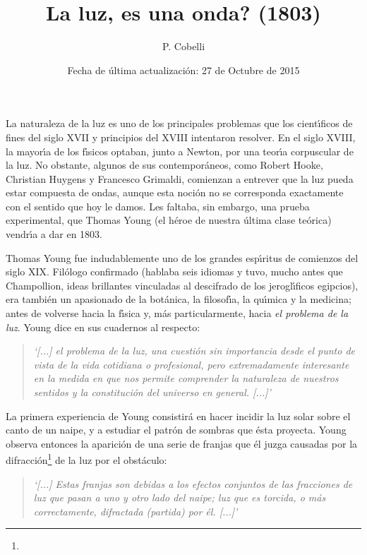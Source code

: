 \documentclass{article}
\begin{document}
\title{La luz, es una onda? (1803)}
\author{P. Cobelli}
\date{Fecha de \'ultima actualizaci\'on: 27 de Octubre de 2015}
\maketitle

La naturaleza de la luz es uno de los principales problemas que los 
cient\'\i ficos de fines del siglo XVII y principios del XVIII intentaron
resolver. En el siglo XVIII, la mayor\'\i a de los f\'\i sicos optaban,
junto a Newton, por una teor\'\i a corpuscular de la luz. No obstante, algunos
de sus contempor\'aneos, como Robert Hooke, Christian Huygens y Francesco
Grimaldi, comienzan a entrever que la luz pueda estar compuesta de ondas, 
aunque esta noci\'on no se corresponda exactamente con el sentido que hoy
le damos. Les faltaba, sin embargo, una prueba experimental, que Thomas
Young (el h\'eroe de nuestra \'ultima clase te\'orica) vendr\'\i a a dar
en 1803. 

Thomas Young fue indudablemente uno de los grandes esp\'\i ritus de comienzos
del siglo XIX. Fil\'ologo confirmado (hablaba seis idiomas y tuvo, mucho
antes que Champollion, ideas brillantes vinculadas al descifrado de los 
jerogl\'\i ficos egipcios), era tambi\'en un apasionado de la bot\'anica, 
la filosof\'\i a, la qu\'\i mica y la medicina; antes de volverse hacia la
f\'\i sica y, m\'as particularmente, hacia {\it el problema de la luz}. 
Young dice en sus cuadernos al respecto: 

\begin{quote}
    {\it
`[...] el problema de la luz, una cuesti\'on sin importancia desde el punto de
    vista de la vida cotidiana o profesional, pero extremadamente interesante
    en la medida en que nos permite comprender la naturaleza de nuestros 
    sentidos y la constituci\'on del universo en general. [...]'
}
\end{quote}

La primera experiencia de Young consistir\'a en hacer incidir la luz solar
sobre el canto de un naipe, y a estudiar el patr\'on de sombras que \'esta
proyecta. Young observa entonces la aparici\'on de una serie de franjas que
\'el juzga causadas por la difracci\'on\footnote{} de la luz por el 
obst\'aculo:

\begin{quote}
    {\it
`[...] Estas franjas son debidas a los efectos conjuntos de las fracciones
de luz que pasan a uno y otro lado del naipe; luz que es torcida, o m\'as
correctamente, difractada (partida) por \'el. [...]'
    }
\end{quote}
\end{document}
